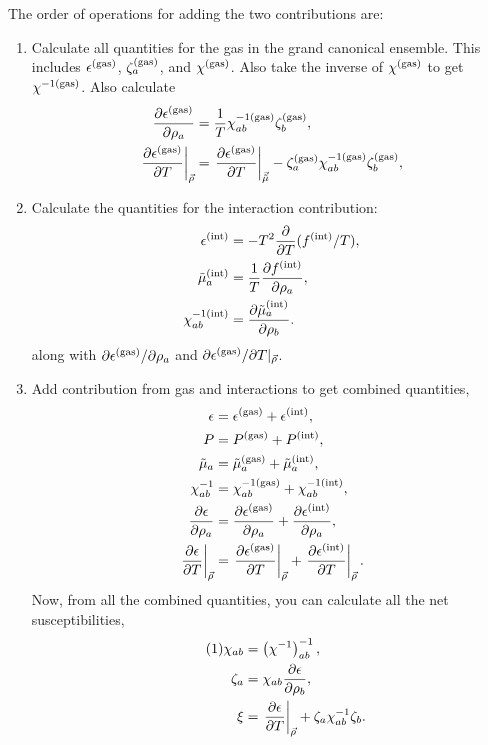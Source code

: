 \documentclass[12pt]{article}
\numberwithin{equation}{section}
\numberwithin{figure}{section}
\newcommand\eqnumber{\addtocounter{equation}{1}\tag{\theequation}}
\begin{document}
The order of operations for adding the two contributions are:
\begin{enumerate}\itemsep=0pt
        \item Calculate all quantities for the gas in the grand canonical ensemble. This includes $\epsilon^{\rm(gas)}$, $\zeta_a^{\rm(gas)}$, and $\chi^{\rm(gas)}$. Also take the inverse of $\chi^{\rm(gas)}$ to get $\chi^{-1{\rm(gas)}}$. Also calculate
        \begin{align*}
        \frac{\partial\epsilon^{\rm(gas)}}{\partial\rho_a}&=\frac{1}{T}\chi^{-1{\rm(gas)}}_{ab}\zeta^{\rm(gas)}_b,\\
        \left.\frac{\partial\epsilon^{\rm(gas)}}{\partial T}\right|_{\vec{\rho}}&=\left.\frac{\partial\epsilon^{\rm(gas)}}{\partial T}\right|_{\vec{\tilde{\mu}}}-\zeta^{\rm(gas)}_a\chi^{-1{\rm(gas)}}_{ab}\zeta^{\rm(gas)}_b,\\
        \end{align*}
        \item Calculate the quantities for the interaction contribution: 
        \begin{align*}
        \epsilon^{\rm(int)}&=-T^2\frac{\partial}{\partial T}(f^{\rm(int)}/T),\\
        \tilde{\mu}_a^{\rm(int)}&=\frac{1}{T}\frac{\partial f^{\rm(int)}}{\partial\rho_a},\\
        \chi^{-1{\rm(int)}}_{ab}&=\frac{\partial\tilde{\mu}^{\rm(int)}_a}{\partial\rho_b}.
        \end{align*}
        along with $\partial\epsilon^{\rm(gas)}/\partial\rho_a$ and $\partial\epsilon^{\rm(gas)}/\partial T|_{\vec{\rho}}$.
        \item Add contribution from gas and interactions to  get combined quantities,
        \begin{align*}
        \epsilon&=\epsilon^{\rm(gas)}+\epsilon^{\rm(int)},\\
        P&=P^{\rm(gas)}+P^{\rm(int)},\\
        \tilde{\mu}_a&=\tilde{\mu}_a^{\rm(gas)}+\tilde{\mu}_a^{\rm(int)},\\
        \chi^{-1}_{ab}&=\chi^{-1{\rm(gas)}}_{ab}+\chi^{-1{\rm(int)}}_{ab},\\
        \frac{\partial\epsilon}{\partial\rho_a}&=\frac{\partial\epsilon^{\rm(gas)}}{\partial\rho_a}+\frac{\partial\epsilon^{\rm(int)}}{\partial\rho_a},\\
        \left.\frac{\partial\epsilon}{\partial T}\right|_{\vec{\rho}}&=\left.\frac{\partial\epsilon^{\rm(gas)}}{\partial T}\right|_{\vec{\rho}}
        +\left.\frac{\partial\epsilon^{\rm(int)}}{\partial T}\right|_{\vec{\rho}}.
        \end{align*}
        Now, from all the combined quantities, you can calculate all the net susceptibilities,
        \begin{align*}\eqnumber
        \chi_{ab}&=\left(\chi^{-1}\right)^{-1}_{ab},\\
        \zeta_a&=\chi_{ab}\frac{\partial\epsilon}{\partial\rho_b},\\
        \xi&=\left.\frac{\partial\epsilon}{\partial T}\right|_{\vec{\rho}}+\zeta_a\chi^{-1}_{ab}\zeta_b.
        \end{align*}
\end{enumerate}
\end{document}
